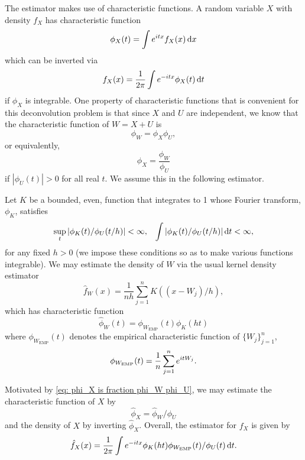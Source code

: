 	The estimator makes use of characteristic functions. A random variable $X$ with density $f_X$ has characteristic function
	\begin{equation}
		\phi_X(t) = \int e^{i t x} f_X(x) \, \mathrm{d} x
	\end{equation}
	which can be inverted via
	\begin{equation}
		f_X(x) = \frac{1}{2\pi} \int e^{-itx} \phi_X(t) \, \mathrm{d} t
	\end{equation}
	if $\phi_X$ is integrable. One property of characteristic functions that is convenient for this deconvolution problem is that since $X$ and $U$ are independent, we know that the characteristic function of $W = X+ U$ is
	\begin{equation}
		\phi_W = \phi_X \phi_U,
	\end{equation}
	or equivalently,
	\begin{equation}
		\phi_X = \frac{\phi_W}{\phi_U}
		\label{eq: phi_X is fraction phi_W phi_U}
	\end{equation}
	if $|\phi_U(t)| > 0$ for all real $t$. We assume this in the following estimator.

	Let $K$ be a bounded, even, function that integrates to 1 whose Fourier transform, $\phi_K$, satisfies
	\begin{align}
		\sup_t |\phi_K(t) / \phi_U(t / h) | < \infty, &&\int|\phi_K(t) / \phi_U(t / h)| \, \mathrm{d} t < \infty,
	\end{align}
	for any fixed $h > 0$ (we impose these conditions so as to make various functions integrable). We may estimate the density of $W$ via the usual kernel density estimator
	\begin{equation}
		\hat{f}_W(x) = \frac{1}{n h} \sum_{j = 1}^n K((x - W_j)/h),
	\end{equation}
	which has characteristic function
	\begin{equation}
		\hat{\phi}_W(t) = \phi_{W_\mathrm{EMP}}(t) \phi_K(h t)
	\end{equation}
	where $\phi_{W_\mathrm{EMP}}(t)$ denotes the empirical characteristic function of $\{W_j\}_{j = 1}^n$,
	\begin{equation}
		\phi_{W_\mathrm{EMP}}(t) = \frac{1}{n}\sum_{j = 1}^n e^{itW_j}.
	\end{equation}

	Motivated by \eqref{eq: phi_X is fraction phi_W phi_U}, we may estimate the characteristic function of $X$ by 
	\begin{equation}
		\hat{\phi}_X = \hat{\phi}_W / \phi_U
	\end{equation}
	and the density of $X$ by inverting $\hat{\phi}_X$. Overall, the estimator for $f_X$ is given by
	\begin{equation}
	\label{eq:standard deconvolution estimator}
		\hat{f}_X(x) = \frac{1}{2\pi} \int e^{-itx} \phi_K(ht) \phi_{W_\mathrm{EMP}}(t)  / \phi_U(t) \, \mathrm{d} t.
	\end{equation}

